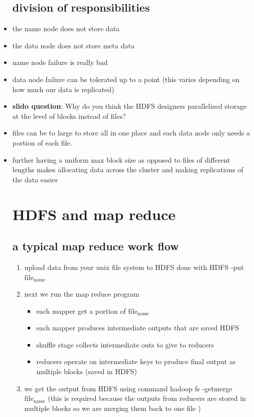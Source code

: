 \documentclass{article}
\begin{document}
\begin{itemize}
\subsection*{division of responsibilities}
\item the name node does not store data 
\item the data node does not store meta data
\item name node failure is really bad 
\item data node failure can be tolerated up to a point (this varies depending on how much our data is replicated)
\item \textbf{slido question}: Why do you think the HDFS designers
parallelized storage at the level of blocks
instead of files?
\item files can be to large to store all in one place and each data node only needs a portion of each file. 
\item further having a uniform max block size as opposed to files of different lengths makes allocating data across the cluster and making replications of the data easier 

\section*{HDFS and map reduce}
\subsection*{a typical map reduce work flow}
\begin{enumerate}
    \item upload data from your unix file system to HDFS done with HDFS -put $\text{file}_\text{name}$ 
    \item next we run the map reduce program 
    \begin{itemize}
        \item each mapper get a portion of $\text{file}_\text{name}$ 
        \item each mapper produces intermediate outputs that are saved HDFS
        \item shuffle stage collects intermediate outs to give to reducers
        \item reducers operate on intermediate keys to produce final output as multiple blocks (saved in HDFS)
    \end{itemize}
    \item we get the output from HDFS using command hadoop fs -getmerge $\text{file}_\text{name}$ (this is required because the outputs from reducers are stored in multiple blocks so we are merging them back to one file )
\end{enumerate}

\end{itemize}
\end{document}
